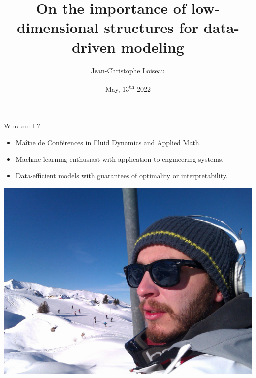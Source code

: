 \documentclass[aspectratio=169]{beamer}
\title{On the importance of low-dimensional structures for data-driven modeling}
\author[JC]{Jean-Christophe Loiseau}
\date[]{May, 13\textsuperscript{th} 2022}
\begin{document}
\begin{frame}
  \titlepage
\end{frame}


  

  
  

\begin{frame}{Who am I ?}
  \vfill
  \begin{minipage}{.68\textwidth}
    \begin{itemize}
    \item Maître de Conférences in Fluid Dynamics and Applied Math.

      \bigskip

    \item Machine-learning enthusiast with application to engineering systems.

      \bigskip

    \item Data-efficient models with guarantees of optimality or interpretability.
    \end{itemize}
  \end{minipage}%
  \hfill
  \begin{minipage}{.28\textwidth}
    \includegraphics[width=\textwidth]{myself}
  \end{minipage}
  
  \vfill
\end{frame}
\end{document}
